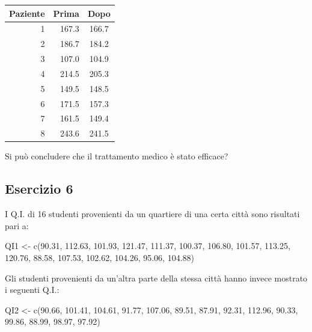 \documentclass[a4paper,12pt,oneside]{book}
\newenvironment{Shaded}{\begin{snugshade}}{\end{snugshade}}
\newcommand{\FloatTok}[1]{#1}
\newcommand{\OtherTok}[1]{#1}
\newcommand{\FunctionTok}[1]{#1}
\newcommand{\NormalTok}[1]{#1}
\begin{document}
\begin{longtable}[]{@{}rrc@{}}
\toprule
Paziente & Prima & Dopo \\
\midrule
\endhead
1 & 167.3 & 166.7 \\
2 & 186.7 & 184.2 \\
3 & 107.0 & 104.9 \\
4 & 214.5 & 205.3 \\
5 & 149.5 & 148.5 \\
6 & 171.5 & 157.3 \\
7 & 161.5 & 149.4 \\
8 & 243.6 & 241.5 \\
\bottomrule
\end{longtable}

Si può concludere che il trattamento medico è stato efficace?

\hypertarget{esercizio-6-1}{%
\subsection{Esercizio 6}\label{esercizio-6-1}}

I Q.I. di 16 studenti provenienti da un quartiere di una certa città sono risultati pari a:

\begin{Shaded}
\begin{Highlighting}[]
\NormalTok{QI1 }\OtherTok{\textless{}{-}} \FunctionTok{c}\NormalTok{(}\FloatTok{90.31}\NormalTok{, }\FloatTok{112.63}\NormalTok{, }\FloatTok{101.93}\NormalTok{, }\FloatTok{121.47}\NormalTok{, }\FloatTok{111.37}\NormalTok{, }\FloatTok{100.37}\NormalTok{, }\FloatTok{106.80}\NormalTok{,}
         \FloatTok{101.57}\NormalTok{, }\FloatTok{113.25}\NormalTok{, }\FloatTok{120.76}\NormalTok{,  }\FloatTok{88.58}\NormalTok{, }\FloatTok{107.53}\NormalTok{, }\FloatTok{102.62}\NormalTok{, }\FloatTok{104.26}\NormalTok{,}
         \FloatTok{95.06}\NormalTok{, }\FloatTok{104.88}\NormalTok{)}
\end{Highlighting}
\end{Shaded}

Gli studenti provenienti da un'altra parte della stessa città hanno invece mostrato i seguenti Q.I.:

\begin{Shaded}
\begin{Highlighting}[]
\NormalTok{QI2 }\OtherTok{\textless{}{-}} \FunctionTok{c}\NormalTok{(}\FloatTok{90.66}\NormalTok{, }\FloatTok{101.41}\NormalTok{, }\FloatTok{104.61}\NormalTok{,  }\FloatTok{91.77}\NormalTok{, }\FloatTok{107.06}\NormalTok{,  }\FloatTok{89.51}\NormalTok{,  }\FloatTok{87.91}\NormalTok{,}
         \FloatTok{92.31}\NormalTok{, }\FloatTok{112.96}\NormalTok{,  }\FloatTok{90.33}\NormalTok{,  }\FloatTok{99.86}\NormalTok{,  }\FloatTok{88.99}\NormalTok{,  }\FloatTok{98.97}\NormalTok{,  }\FloatTok{97.92}\NormalTok{)}
\end{Highlighting}
\end{Shaded}
\end{document}
